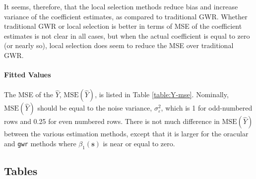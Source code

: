 \documentclass[authoryear, review, 11pt]{elsarticle}
\begin{document}
	It seems, therefore, that the local selection methods reduce bias and increase variance of the coefficient estimates, as compared to traditional GWR. Whether traditional GWR or local selection is better in terms of MSE of the coefficient estimates is not clear in all cases, but when the actual coefficient is equal to zero (or nearly so), local selection does seem to reduce the MSE over traditional GWR.
	
	
	
	\paragraph{Fitted Values} The MSE of the $\hat{Y}$, $\text{MSE}\left(\hat{Y}\right)$, is listed in Table \ref{table:Y-mse}. Nominally, $\text{MSE}\left(\hat{Y}\right)$ should be equal to the noise variance, $\sigma_{\varepsilon}^2$, which is 1 for odd-numbered rows and 0.25 for even numbered rows. There is not much difference in $\text{MSE}\left(\hat{Y}\right)$ between the various estimation methods, except that it is larger for the oracular and \verb!gwr! methods where $\beta_1(\bm{s})$ is near or equal to zero.
	
	\subsection{Tables}
\end{document}
